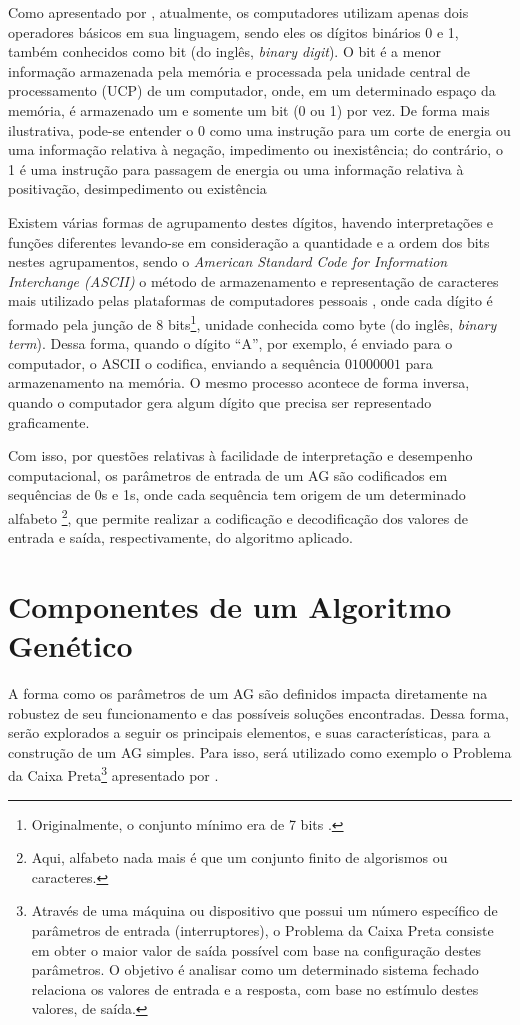 Como apresentado por \citet[pg.42]{fedeli_introducao_2009}, atualmente, os computadores utilizam apenas dois operadores básicos em sua linguagem, sendo eles os dígitos binários 0 e 1, também conhecidos como bit (do inglês, \textit{binary digit}). O bit é a menor informação armazenada pela memória e processada pela unidade central de processamento (UCP) de um computador, onde, em um determinado espaço da memória, é armazenado um e somente um bit (0 ou 1) por vez. De forma mais ilustrativa, pode-se entender o 0 como uma instrução para um corte de energia ou uma informação relativa à negação, impedimento ou inexistência; do contrário, o 1 é uma instrução para passagem de energia ou uma informação relativa à positivação, desimpedimento ou existência

Existem várias formas de agrupamento destes dígitos, havendo interpretações e funções diferentes levando-se em consideração a quantidade e a ordem dos bits nestes agrupamentos, sendo o \textit{American Standard Code for Information Interchange (ASCII)} o método de armazenamento e representação de caracteres mais utilizado pelas plataformas de computadores pessoais \citep[pg.46]{fedeli_introducao_2009}, onde cada dígito é formado pela junção de 8 bits\footnote{Originalmente, o conjunto mínimo era de 7 bits \citet{gorn_american_1963}.}, unidade conhecida como byte (do inglês, \textit{binary term}). Dessa forma, quando o dígito \enquote{A}, por exemplo, é enviado para o computador, o ASCII o codifica, enviando a sequência $01000001$ para armazenamento na memória. O mesmo processo acontece de forma inversa, quando o computador gera algum dígito que precisa ser representado graficamente.

Com isso, por questões relativas à facilidade de interpretação e desempenho computacional, os parâmetros de entrada de um AG são codificados em sequências de 0s e 1s, onde cada sequência tem origem de um determinado alfabeto \footnote{Aqui, alfabeto nada mais é que um conjunto finito de algorismos ou caracteres.}, que permite realizar a codificação e decodificação dos valores de entrada e saída, respectivamente, do algoritmo aplicado.

\section{Componentes de um Algoritmo Genético}
\label{sec:componentes_de_um_algoritmo_genetico}

A forma como os parâmetros de um AG são definidos impacta diretamente na robustez de seu funcionamento e das possíveis soluções encontradas. Dessa forma, serão explorados a seguir os principais elementos, e suas características, para a construção de um AG simples. Para isso, será utilizado como exemplo o Problema da Caixa Preta\footnote{\label{rodape:problema_caixa_preta}Através de uma máquina ou dispositivo que possui um número específico de parâmetros de entrada (interruptores), o Problema da Caixa Preta consiste em obter o maior valor de saída possível com base na configuração destes parâmetros. O objetivo é analisar como um determinado sistema fechado relaciona os valores de entrada e a resposta, com base no estímulo destes valores, de saída.} apresentado por \citet[p.8]{goldberg_genetic_1989}.

